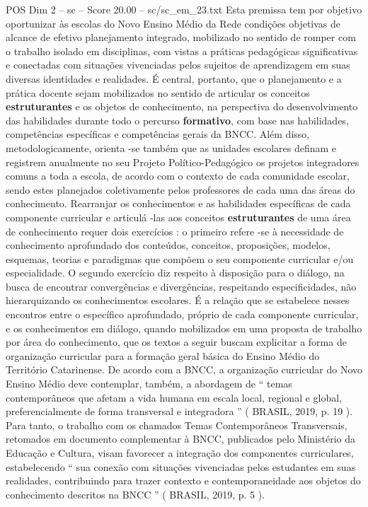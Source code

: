 \begin{textsample}{POS Dim 2 – sc – Score 20.00 – sc/sc\_em\_23.txt}
Esta premissa tem por objetivo oportunizar às escolas do Novo Ensino Médio da Rede condições objetivas de alcance de efetivo planejamento integrado, mobilizado no sentido de romper com o trabalho isolado em disciplinas, com vistas a práticas pedagógicas significativas e conectadas com situações vivenciadas pelos sujeitos de aprendizagem em suas diversas identidades e realidades.
É central, portanto, que o planejamento e a prática docente sejam mobilizados no sentido de articular os conceitos \textbf{estruturantes} e os objetos de conhecimento, na perspectiva do desenvolvimento das habilidades durante todo o percurso \textbf{formativo}, com base nas habilidades, competências específicas e competências gerais da BNCC.
Além disso, metodologicamente, orienta -se também que as unidades escolares definam e registrem anualmente no seu Projeto Político-Pedagógico os projetos integradores comuns a toda a escola, de acordo com o contexto de cada comunidade escolar, sendo estes planejados coletivamente pelos professores de cada uma das áreas do conhecimento.
Rearranjar os conhecimentos e as habilidades específicas de cada componente curricular e articulá -las aos conceitos \textbf{estruturantes} de uma área de conhecimento requer dois exercícios : o primeiro refere -se à necessidade de conhecimento aprofundado dos conteúdos, conceitos, proposições, modelos, esquemas, teorias e paradigmas que compõem o seu componente curricular e/ou especialidade.
O segundo exercício diz respeito à disposição para o diálogo, na busca de encontrar convergências e divergências, respeitando especificidades, não hierarquizando os conhecimentos escolares.
É a relação que se estabelece nesses encontros entre o específico aprofundado, próprio de cada componente curricular, e os conhecimentos em diálogo, quando mobilizados em uma proposta de trabalho por área do conhecimento, que os textos a seguir buscam explicitar a forma de organização curricular para a formação geral básica do Ensino Médio do Território Catarinense.
De acordo com a BNCC, a organização curricular do Novo Ensino Médio deve contemplar, também, a abordagem de “ temas contemporâneos que afetam a vida humana em escala local, regional e global, preferencialmente de forma transversal e integradora ” ( BRASIL, 2019, p. 19 ).
Para tanto, o trabalho com os chamados Temas Contemporâneos Transversais, retomados em documento complementar à BNCC, publicados pelo Ministério da Educação e Cultura, visam favorecer a integração dos componentes curriculares, estabelecendo “ sua conexão com situações vivenciadas pelos estudantes em suas realidades, contribuindo para trazer contexto e contemporaneidade aos objetos do conhecimento descritos na BNCC ” ( BRASIL, 2019, p. 5 ).

\end{textsample}
